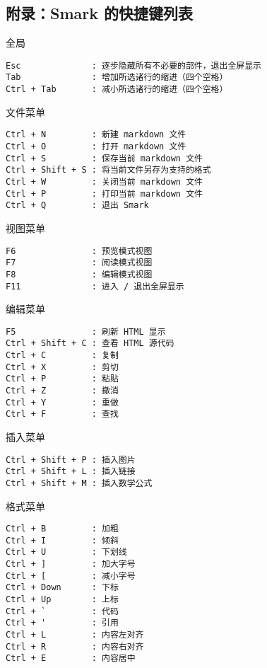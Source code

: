 \hypertarget{ux9644ux5f55smark-ux7684ux5febux6377ux952eux5217ux8868}{%
\subsection{附录：Smark
的快捷键列表}\label{ux9644ux5f55smark-ux7684ux5febux6377ux952eux5217ux8868}}

全局

\begin{verbatim}
Esc              : 逐步隐藏所有不必要的部件，退出全屏显示
Tab              : 增加所选诸行的缩进（四个空格）
Ctrl + Tab       : 减小所选诸行的缩进（四个空格）
\end{verbatim}

文件菜单

\begin{verbatim}
Ctrl + N         : 新建 markdown 文件
Ctrl + O         : 打开 markdown 文件
Ctrl + S         : 保存当前 markdown 文件
Ctrl + Shift + S : 将当前文件另存为支持的格式
Ctrl + W         : 关闭当前 markdown 文件
Ctrl + P         : 打印当前 markdown 文件
Ctrl + Q         : 退出 Smark 
\end{verbatim}

视图菜单

\begin{verbatim}
F6               : 预览模式视图
F7               : 阅读模式视图
F8               : 编辑模式视图
F11              : 进入 / 退出全屏显示
\end{verbatim}

编辑菜单

\begin{verbatim}
F5               : 刷新 HTML 显示
Ctrl + Shift + C : 查看 HTML 源代码
Ctrl + C         : 复制
Ctrl + X         : 剪切
Ctrl + P         : 粘贴
Ctrl + Z         : 撤消
Ctrl + Y         : 重做
Ctrl + F         : 查找
\end{verbatim}

插入菜单

\begin{verbatim}
Ctrl + Shift + P : 插入图片
Ctrl + Shift + L : 插入链接
Ctrl + Shift + M : 插入数学公式
\end{verbatim}

格式菜单

\begin{verbatim}
Ctrl + B         : 加粗
Ctrl + I         : 倾斜
Ctrl + U         : 下划线
Ctrl + ]         : 加大字号
Ctrl + [         : 减小字号
Ctrl + Down      : 下标
Ctrl + Up        : 上标
Ctrl + `         : 代码
Ctrl + '         : 引用
Ctrl + L         : 内容左对齐
Ctrl + R         : 内容右对齐
Ctrl + E         : 内容居中
\end{verbatim}
